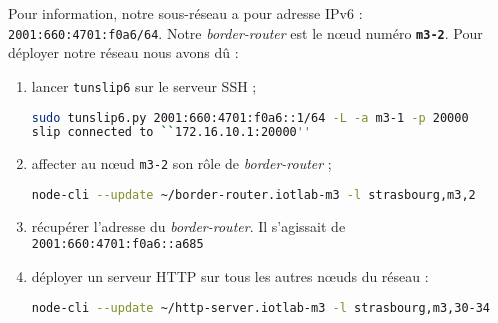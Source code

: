 \documentclass[	DIV=calc,%
							paper=a4,%
							fontsize=11pt,%
			  ]{scrartcl}	 					%
\begin{document}

Pour information, notre sous-réseau a pour adresse IPv6 : \texttt{2001:660:4701:f0a6/64}. Notre \textit{border-router} est le nœud numéro \textbf{\texttt{m3-2}}. Pour déployer notre réseau nous avons dû :
\begin{enumerate}
\item lancer \texttt{tunslip6} sur le serveur SSH ;
\begin{lstlisting}[language=bash]
sudo tunslip6.py 2001:660:4701:f0a6::1/64 -L -a m3-1 -p 20000
slip connected to ``172.16.10.1:20000''
\end{lstlisting}
\item affecter au nœud \texttt{m3-2} son rôle de \textit{border-router} ;
\begin{lstlisting}[language=bash]
node-cli --update ~/border-router.iotlab-m3 -l strasbourg,m3,2
\end{lstlisting}
\item récupérer l'adresse du \textit{border-router}. Il s'agissait de \texttt{2001:660:4701:f0a6::a685}
\item déployer un serveur HTTP sur tous les autres nœuds du réseau :
\begin{lstlisting}[language=bash]
node-cli --update ~/http-server.iotlab-m3 -l strasbourg,m3,30-34
\end{lstlisting}
\end{enumerate}
\end{document}
